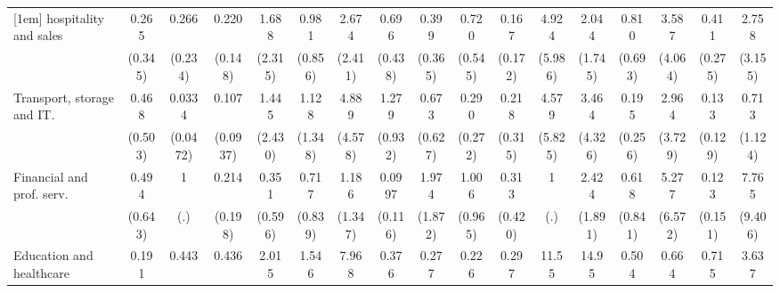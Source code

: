 {\begin{tabular}{l*{16}{c}}
[1em]
hospitality and sales&       0.265         &       0.266         &       0.220\sym{*}  &       1.688         &       0.981         &       2.674         &       0.696         &       0.399         &       0.720         &       0.167         &       4.924         &       2.044         &       0.810         &       3.587         &       0.411         &       2.758         \\
                    &     (0.345)         &     (0.234)         &     (0.148)         &     (2.315)         &     (0.856)         &     (2.411)         &     (0.438)         &     (0.365)         &     (0.545)         &     (0.172)         &     (5.986)         &     (1.745)         &     (0.693)         &     (4.064)         &     (0.275)         &     (3.155)         \\
[1em]
Transport, storage and IT.&       0.468         &      0.0334\sym{*}  &       0.107\sym{*}  &       1.445         &       1.128         &       4.889         &       1.279         &       0.673         &       0.290         &       0.218         &       4.579         &       3.464         &       0.195         &       2.964         &       0.133\sym{*}  &       0.713         \\
                    &     (0.503)         &    (0.0472)         &    (0.0937)         &     (2.430)         &     (1.348)         &     (4.578)         &     (0.932)         &     (0.627)         &     (0.272)         &     (0.315)         &     (5.825)         &     (4.326)         &     (0.256)         &     (3.729)         &     (0.129)         &     (1.124)         \\
[1em]
Financial and prof. serv.&       0.494         &           1         &       0.214         &       0.351         &       0.717         &       1.186         &      0.0997\sym{*}  &       1.974         &       1.006         &       0.313         &           1         &       2.424         &       0.618         &       5.277         &       0.123         &       7.765         \\
                    &     (0.643)         &         (.)         &     (0.198)         &     (0.596)         &     (0.839)         &     (1.347)         &     (0.116)         &     (1.872)         &     (0.965)         &     (0.420)         &         (.)         &     (1.891)         &     (0.841)         &     (6.572)         &     (0.151)         &     (9.406)         \\
[1em]
Education and healthcare&       0.191         &       0.443         &       0.436         &       2.015         &       1.546         &       7.968\sym{*}  &       0.376         &       0.277         &       0.226         &       0.297         &       11.55         &       14.95\sym{*}  &       0.504         &       0.664         &       0.715         &       3.637         \\

\end{tabular}}
